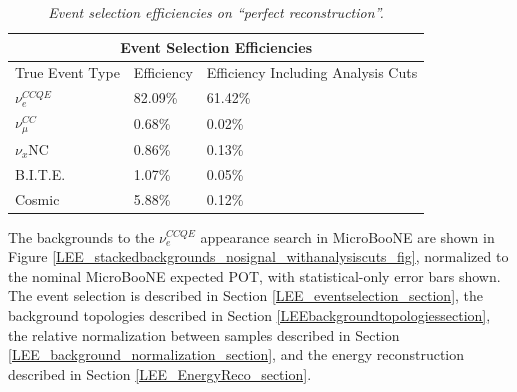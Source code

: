\begin{table}
\begin{tabular}{ |p{4 cm}|p{3 cm}|p{6 cm}|  }
 \hline
 \multicolumn{3}{|c|}{Event Selection Efficiencies} \\
 \hline
 True Event Type & Efficiency & Efficiency Including Analysis Cuts \\
 \hline \hline
 $\nu_e^{CCQE}$ & 82.09\% & 61.42\% \\\hline
 
 $\nu_\mu^{CC}$ & 0.68\% & 0.02\% \\\hline

 $\nu_x$NC & 0.86\% & 0.13\% \\\hline

 B.I.T.E. & 1.07\% & 0.05\% \\\hline

 Cosmic & 5.88\% & 0.12\% \\\hline

 \hline
\end{tabular}
\caption{\textit{Event selection efficiencies on ``perfect reconstruction''.}}\label{eventselection_efficiency_table}
\end{table}



The backgrounds to the $\nu_e^{CCQE}$ appearance search in MicroBooNE are shown in Figure \ref{LEE_stackedbackgrounds_nosignal_withanalysiscuts_fig}, normalized to the nominal MicroBooNE expected POT, with statistical-only error bars shown. The event selection is described in Section \ref{LEE_eventselection_section}, the background topologies described in Section \ref{LEEbackgroundtopologiessection}, the relative normalization between samples described in Section \ref{LEE_background_normalization_section}, and the energy reconstruction described in Section \ref{LEE_EnergyReco_section}.


